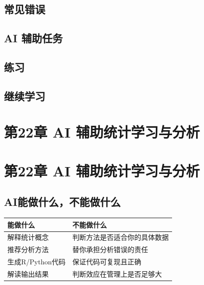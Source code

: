 \documentclass[
  letterpaper,
]{scrbook}
\newcounter{none} %
\begin{document}
\section{常见错误}\label{ux5e38ux89c1ux9519ux8bef-18}

\section{AI 辅助任务}\label{ai-ux8f85ux52a9ux4efbux52a1-11}

\section{练习}\label{ux7ec3ux4e60-20}

\section{继续学习}\label{ux7ee7ux7eedux5b66ux4e60-11}

\chapter{第22章 AI
辅助统计学习与分析}\label{ux7b2c22ux7ae0-ai-ux8f85ux52a9ux7edfux8ba1ux5b66ux4e60ux4e0eux5206ux6790}

\chapter{第22章 AI
辅助统计学习与分析}\label{ux7b2c22ux7ae0-ai-ux8f85ux52a9ux7edfux8ba1ux5b66ux4e60ux4e0eux5206ux6790-1}

\section{AI能做什么，不能做什么}\label{aiux80fdux505aux4ec0ux4e48ux4e0dux80fdux505aux4ec0ux4e48}

{\def\LTcaptype{none} %
\begin{longtable}[]{@{}ll@{}}
\toprule\noalign{}
能做什么 & 不能做什么 \\
\midrule\noalign{}
\endhead
\bottomrule\noalign{}
\endlastfoot
解释统计概念 & 判断方法是否适合你的具体数据 \\
推荐分析方法 & 替你承担分析错误的责任 \\
生成R/Python代码 & 保证代码可复现且正确 \\
解读输出结果 & 判断效应在管理上是否足够大 \\
\end{longtable}
}
\end{document}

